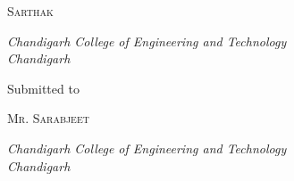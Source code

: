 \documentclass[a4paper, 11pt, oneside]{book} %
\begin{document}
\begin{titlepage}
	{\scshape\Large Sarthak \\} %
	
	\vspace{0.5\baselineskip} %
	
	\textit{Chandigarh College of Engineering and Technology \\ Chandigarh} %
	
	\vfill %
	
	
	Submitted to 
	
	\vspace{0.5\baselineskip} %
	
	{\scshape\Large Mr. Sarabjeet \\} %
	
	\vspace{0.5\baselineskip} %
	
	\textit{Chandigarh College of Engineering and Technology \\ Chandigarh} %
	
	\vfill %
	

\end{titlepage}

\end{document}
